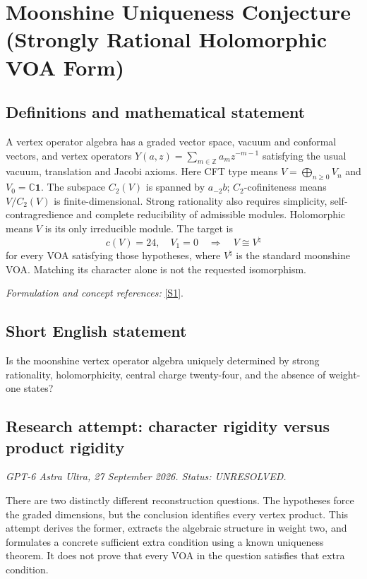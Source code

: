 \documentclass[11pt]{article}
\begin{document}
\section*{\texorpdfstring{Moonshine Uniqueness Conjecture (Strongly Rational Holomorphic VOA Form)}{Moonshine Uniqueness Conjecture (Strongly Rational Holomorphic VOA Form)}}\label{30006817}
\subsection{Definitions and mathematical statement}
A vertex operator algebra has a graded vector space, vacuum and conformal vectors, and vertex operators $Y(a,z)=\sum_{m\in{\mathbb{Z}}}a_mz^{-m-1}$ satisfying the usual vacuum, translation and Jacobi axioms. Here CFT type means $V=\bigoplus_{n\ge0}V_n$ and $V_0={\mathbb{C}}\mathbf1$. The subspace $C_2(V)$ is spanned by $a_{-2}b$; $C_2$-cofiniteness means $V/C_2(V)$ is finite-dimensional. Strong rationality also requires simplicity, self-contragredience and complete reducibility of admissible modules. Holomorphic means $V$ is its only irreducible module. The target is
\[
 c(V)=24,\quad V_1=0\quad\Longrightarrow\quad V\cong V^{\natural}
\]
for every VOA satisfying those hypotheses, where $V^{\natural}$ is the standard moonshine VOA. Matching its character alone is not the requested isomorphism.
\par\smallskip\textit{Formulation and concept references:} \href{https://arxiv.org/pdf/2410.18166}{[S1]}.

\subsection{Short English statement}
Is the moonshine vertex operator algebra uniquely determined by strong rationality, holomorphicity, central charge twenty-four, and the absence of weight-one states?
\subsection{Research attempt: character rigidity versus product rigidity}
\textit{GPT-6 Astra Ultra, 27 September 2026. Status: UNRESOLVED.}

There are two distinctly different reconstruction questions. The hypotheses force the graded dimensions, but the conclusion identifies every vertex product. This attempt derives the former, extracts the algebraic structure in weight two, and formulates a concrete sufficient extra condition using a known uniqueness theorem. It does not prove that every VOA in the question satisfies that extra condition.
\end{document}
